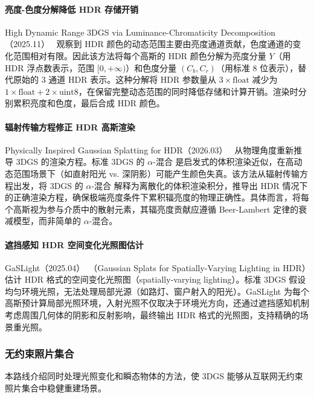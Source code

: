 \paragraph{亮度-色度分解降低 HDR 存储开销}

High Dynamic Range 3DGS via Luminance-Chromaticity Decomposition（2025.11）~\cite{2511_12895} 观察到 HDR 颜色的动态范围主要由亮度通道贡献，色度通道的变化范围相对有限。因此该方法将每个高斯的 HDR 颜色分解为亮度分量 $Y$（用 HDR 浮点数表示，范围 $[0, +\infty)$）和色度分量 $(C_b, C_r)$（用标准 8 位表示），替代原始的 3 通道 HDR 表示。这种分解将 HDR 参数量从 $3 \times \text{float}$ 减少为 $1 \times \text{float} + 2 \times \text{uint8}$，在保留完整动态范围的同时降低存储和计算开销。渲染时分别累积亮度和色度，最后合成 HDR 颜色。

\paragraph{辐射传输方程修正 HDR 高斯渲染}

Physically Inspired Gaussian Splatting for HDR（2026.03）~\cite{2603_28020} 从物理角度重新推导 3DGS 的渲染方程。标准 3DGS 的 $\alpha$-混合 是启发式的体积渲染近似，在高动态范围场景下（如直射阳光 vs. 深阴影）可能产生颜色失真。该方法从辐射传输方程出发，将 3DGS 的 $\alpha$-混合 解释为离散化的体积渲染积分，推导出 HDR 情况下的正确渲染方程，确保极端亮度条件下累积辐亮度的物理正确性。具体而言，将每个高斯视为参与介质中的散射元素，其辐亮度贡献应遵循 Beer-Lambert 定律的衰减模型，而非简单的 $\alpha$-混合。

\paragraph{遮挡感知 HDR 空间变化光照图估计}

GaSLight（2025.04）~\cite{2504_10809}（Gaussian Splats for Spatially-Varying Lighting in HDR）估计 HDR 格式的空间变化光照图（spatially-varying lighting）。标准 3DGS 假设均匀环境光照，无法处理局部光源（如路灯、窗户射入的阳光）。GaSLight 为每个高斯预计算局部光照环境，入射光照不仅取决于环境光方向，还通过遮挡感知机制考虑周围几何体的阴影和反射影响，最终输出 HDR 格式的光照图，支持精确的场景重光照。

\subsubsection{无约束照片集合}

本路线介绍同时处理光照变化和瞬态物体的方法，使 3DGS 能够从互联网无约束照片集合中稳健重建场景。

